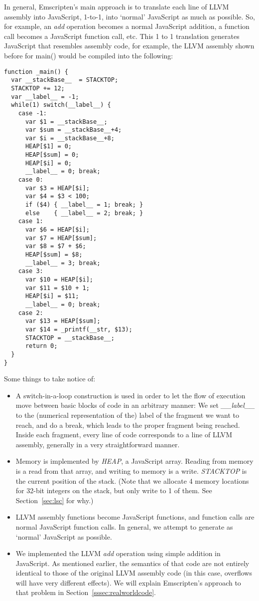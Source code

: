 \documentclass[11pt]{proc}
\begin{document}
In general, Emscripten's main approach is to translate each line of LLVM
assembly into JavaScript, 1-to-1, into `normal' JavaScript
as much as possible. So, for example, an \emph{add} operation becomes
a normal JavaScript addition, a function call becomes a JavaScript
function call, etc. This 1 to 1 translation generates JavaScript
that resembles assembly code, for example, the LLVM assembly shown
before for main() would be compiled into the following:
\label{code:example}
\begin{verbatim}
function _main() {
  var __stackBase__  = STACKTOP;
  STACKTOP += 12;
  var __label__ = -1;
  while(1) switch(__label__) {
    case -1:
      var $1 = __stackBase__;
      var $sum = __stackBase__+4;
      var $i = __stackBase__+8;
      HEAP[$1] = 0;
      HEAP[$sum] = 0;
      HEAP[$i] = 0;
      __label__ = 0; break;
    case 0:
      var $3 = HEAP[$i];
      var $4 = $3 < 100;
      if ($4) { __label__ = 1; break; }
      else    { __label__ = 2; break; }
    case 1:
      var $6 = HEAP[$i];
      var $7 = HEAP[$sum];
      var $8 = $7 + $6;
      HEAP[$sum] = $8;
      __label__ = 3; break;
    case 3:
      var $10 = HEAP[$i];
      var $11 = $10 + 1;
      HEAP[$i] = $11;
      __label__ = 0; break;
    case 2:
      var $13 = HEAP[$sum];
      var $14 = _printf(__str, $13);
      STACKTOP = __stackBase__;
      return 0;
  }
}
\end{verbatim}
Some things
to take notice of:
\begin{itemize}
\item A switch-in-a-loop construction is used in order to let the flow
      of execution move between basic blocks of code in an arbitrary manner: We set
      \emph{\_\_label\_\_} to the (numerical representation of the) label of
      the fragment we want to reach, and do a break, which leads to the proper
      fragment being reached. Inside each fragment, every line of code corresponds to a line of
      LLVM assembly, generally in a very straightforward manner. 
\item Memory is implemented by \emph{HEAP}, a JavaScript array. Reading from
      memory is a read from that array, and writing to memory is a write.
      \emph{STACKTOP} is the current position of the stack. (Note that we
      allocate 4 memory locations for 32-bit integers on the stack, but only 
      write to 1 of them. See Section~\ref{sec:lsc} for why.)
\item LLVM assembly functions become JavaScript functions, and function calls
      are normal JavaScript function calls. In general, we attempt to generate
      as `normal' JavaScript as possible.
\item We implemented the LLVM \emph{add} operation using simple addition in JavaScript.
      As mentioned earlier, the semantics of that code are not entirely identical to
      those of the original LLVM assembly code (in this case, overflows will have very
      different effects). We will explain Emscripten's approach to that problem in
      Section~\ref{sssec:realworldcode}.
\end{itemize}
\end{document}
